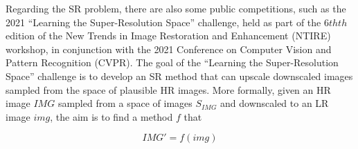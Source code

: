 \documentclass{article}
\begin{document}
Regarding the SR problem, there are also some public competitions, such as the 2021 ``Learning the Super-Resolution Space'' challenge, held as part of the $6th{th}$ edition of the New Trends in Image Restoration and Enhancement (NTIRE) workshop, in conjunction with the 2021 Conference on Computer Vision and Pattern Recognition (CVPR). The goal of the ``Learning the Super-Resolution Space'' challenge is to develop an SR method that can upscale downscaled images sampled from the space of plausible HR images. More formally, given an HR image $IMG$ sampled from a space of images $S_{IMG}$ and downscaled to an LR image $img$, the aim is to find a method $f$ that

\begin{displaymath}
    IMG' = f(img)
\end{displaymath}
\end{document}
